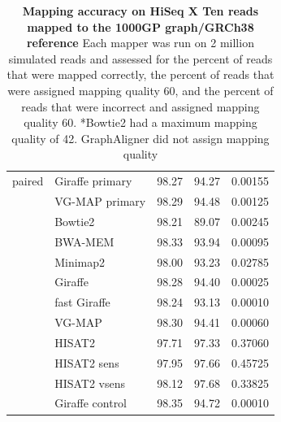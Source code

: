 \documentclass[11pt]{ucscthesis}
\begin{document}
\begin{table}[H]
\begin{tabular}{|l|l|r|r|r|}
        \hline
        paired  & Giraffe primary	& 98.27     & 94.27     & 0.00155 \\
                & VG-MAP primary   	& 98.29     & 94.48     & 0.00125 \\
                & Bowtie2       	& 98.21     & 89.07     & 0.00245 \\
                & BWA-MEM	        & 98.33     & 93.94     & 0.00095 \\
                & Minimap2	        & 98.00     & 93.23     & 0.02785 \\
                & Giraffe	        & 98.28     & 94.40     & 0.00025 \\
                & fast Giraffe	    & 98.24     & 93.13     & 0.00010 \\
                & VG-MAP	        & 98.30     & 94.41     & 0.00060 \\
                & HISAT2        	& 97.71     & 97.33     & 0.37060 \\
                & HISAT2 sens   	& 97.95     & 97.66     & 0.45725 \\
                & HISAT2 vsens	    & 98.12     & 97.68     & 0.33825 \\
                & Giraffe control	& 98.35     & 94.72     & 0.00010 \\
        \hline
        
    \end{tabular}
    \caption[Mapping accuracy on HiSeq X Ten reads mapped to the 1000GP graph/GRCh38 reference]{\textbf{Mapping accuracy on HiSeq X Ten reads mapped to the 1000GP graph/GRCh38 reference} Each mapper was run on 2 million simulated reads and assessed for the percent of reads that were mapped correctly, the percent of reads that were assigned mapping quality 60, and the percent of reads that were incorrect and assigned mapping quality 60. *Bowtie2 had a maximum mapping quality of 42. GraphAligner did not assign mapping quality}
    \label{tab:mapping_accuracy_1kg_hiseqxten}
\end{table}
\end{document}
